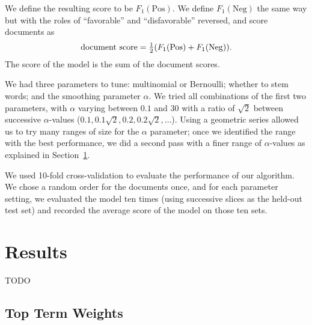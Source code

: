 \documentclass{article}
\newcommand{\PosC}{\mathrm{Pos}}
\newcommand{\NegC}{\mathrm{Neg}}
\begin{document}
We define the resulting score to be \(F_1(\PosC)\).
We define \(F_1(\NegC)\) the same way but with the roles of ``favorable'' and ``disfavorable'' reversed, and score documents as
\[\text{document score}=\tfrac12 (F_1(\PosC) + F_1(\NegC)) \ldotp\]
The score of the model is the sum of the document scores.

We had three parameters to tune: multinomial or Bernoulli; whether to stem words; and the smoothing parameter \(\alpha\).  We tried all combinations of the first two parameters, with \(\alpha\) varying between \(0.1\) and \(30\) with a ratio of \(\sqrt{2}\) between successive \(\alpha\)-values (\(0.1, 0.1\sqrt{2}, 0.2, 0.2\sqrt{2}, \dotsc\)).  Using a geometric series allowed us to try many ranges of size for the \(\alpha\) parameter; once we identified the range with the best performance, we did a second pass with a finer range of \(\alpha\)-values as explained in Section~\ref{sec:Results}.

We used 10-fold cross-validation to evaluate the performance of our algorithm.  We chose a random order for the documents once, and for each parameter setting, we evaluated the model ten times (using successive slices as the held-out test set) and recorded the average score of the model on those ten sets.

\section{Results}
\label{sec:Results}

TODO

\subsection{Top Term Weights}
\label{sec:TopWords}

\end{document}
